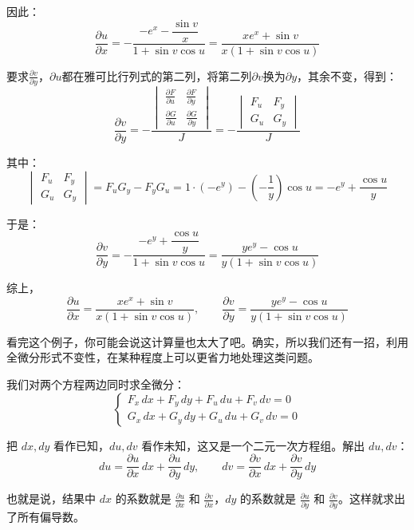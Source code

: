 \begin{myexample}
因此：
\[
\frac{\partial u}{\partial x} = -\frac{-e^x - \dfrac{\sin v}{x}}{1 + \sin v \cos u}
= \frac{x e^x + \sin v}{x(1 + \sin v \cos u)}
\]

要求$\frac{\partial v}{\partial y}$，$\partial u$都在雅可比行列式的第二列，将第二列$\partial v$换为$\partial y$，其余不变，得到：
\[
\frac{\partial v}{\partial y} = -\frac{\begin{vmatrix}
\frac{\partial F}{\partial u} & \frac{\partial F}{\partial y} \\[6pt]
\frac{\partial G}{\partial u} & \frac{\partial G}{\partial y}
\end{vmatrix}}{J} = -\frac{\begin{vmatrix}
F_u & F_y \\
G_u & G_y
\end{vmatrix}}{J}
\]

其中：
\[
\begin{vmatrix}
F_u & F_y \\
G_u & G_y
\end{vmatrix}
= F_uG_y - F_yG_u = 1\cdot(-e^y) - (-\frac{1}{y})\cos u
= -e^y + \frac{\cos u}{y}
\]

于是：
\[
\frac{\partial v}{\partial y} = -\frac{-e^y + \dfrac{\cos u}{y}}{1 + \sin v \cos u}
= \frac{y e^y - \cos u}{y(1 + \sin v \cos u)}
\]

综上，
\[
\frac{\partial u}{\partial x} = \frac{x e^x + \sin v}{x(1+\sin v\cos u)},\qquad
\frac{\partial v}{\partial y} = \frac{y e^y - \cos u}{y(1+\sin v\cos u)}
\]

\end{myexample}

看完这个例子，你可能会说这计算量也太大了吧。确实，所以我们还有一招，利用全微分形式不变性，在某种程度上可以更省力地处理这类问题。

我们对两个方程两边同时求全微分：
\[
\begin{cases}
F_x\,dx + F_y\,dy + F_u\,du + F_v\,dv = 0 \\
G_x\,dx + G_y\,dy + G_u\,du + G_v\,dv = 0
\end{cases}
\]

把 $dx,dy$ 看作已知，$du,dv$ 看作未知，这又是一个二元一次方程组。解出 $du,dv$：
\[
du = \frac{\partial u}{\partial x}\,dx + \frac{\partial u}{\partial y}\,dy,\qquad
dv = \frac{\partial v}{\partial x}\,dx + \frac{\partial v}{\partial y}\,dy
\]

也就是说，结果中 $dx$ 的系数就是 $\frac{\partial u}{\partial x}$ 和 $\frac{\partial v}{\partial x}$，$dy$ 的系数就是 $\frac{\partial u}{\partial y}$ 和 $\frac{\partial v}{\partial y}$。这样就求出了所有偏导数。

